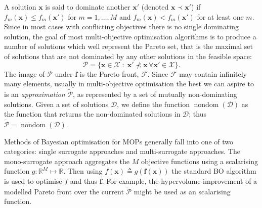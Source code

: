 \documentclass[conference]{IEEEtran}
\newcommand{\evaluatedx}{\bX}
\newcommand{\paretofront}{\mathcal{F}}
\newcommand{\paretoset}{\mathcal{P}}
\newcommand{\attainmentfront}{\mathcal{A}}
\newcommand{\attainmentset}{\evaluatedx_{\mathcal{A}}}
\newcommand{\parameterspace}{\mathcal{X}}
\newcommand{\nobj}{M}
\newcommand{\defn}{\triangleq}
\DeclareMathOperator{\nondom}{nondom}
\newcommand\Papprox{\tilde{\mathcal{P}}}
\newcommand{\bx}{\mathbf{x}}
\newcommand{\bX}{\mathbf{X}}
\newcommand{\bff}{\mathbf{f}}
\newcommand{\data}{\mathcal{D}}
\newcommand{\mnote}[2][\textcolor{red}{\dagger}]{$#1$\marginpar{\color{red}\raggedright\tiny$#1$
    #2}}
\begin{document}
A solution $\bx$ is said to dominate another $\bx'$ (denoted $\bx \prec \bx'$) if $f_m(\bx) \le f_m(\bx')$ for $m = 1, \ldots, \nobj$ and $ f_m(\bx) < f_m(\bx')$ for at least one $m$. Since in most cases with conflicting objectives there is no single dominating solution, the goal of most multi-objective optimisation algorithms is to produce a number of solutions which well represent the Pareto set, that is the maximal set of solutions that are not dominated by any other solutions in the feasible space:
\begin{equation}\label{eqn: Pareto_set}
  \paretoset = \{\mathbf{x} \in \parameterspace \;:\;
  \bx' \not\prec \bx \,\forall \bx' \in \parameterspace \}.
\end{equation}
The image of $\paretoset$ under $\bff$ is the Pareto front, $\paretofront$. Since $\paretofront$ may contain infinitely many elements, usually  in multi-objective optimisation the best we can aspire to is an \emph{approximation} $\Papprox$, as represented by a set of mutually non-dominating solutions.   Given a set of solutions $\data$, we define the function $\nondom(\data)$ as the function that returns the non-dominated solutions in $\data$; thus $\Papprox = \nondom(\data)$.



Methods of Bayesian optimisation for MOPs generally fall into one of two
categories: single surrogate approaches and multi-surrogate approaches. The
mono-surrogate approach aggregates the $\nobj$ objective functions using a
scalarising function $g : \mathbb{R}^\nobj \mapsto \mathbb{R}$. Then using
$f(\bx) \defn g(\bff(\bx))$ the standard BO algorithm is used to optimise
$f$ and thus $\bff$. For example, the hypervolume improvement of a modelled
Pareto front over the current $\Papprox$ might be used as an
scalarising function. 
\end{document}
